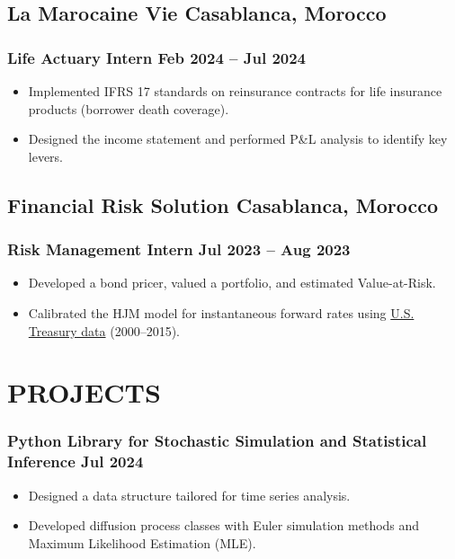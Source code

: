 \documentclass[11pt]{amdresume}
\begin{document}
\subsection{La Marocaine Vie \hfill Casablanca, Morocco}
\subsubsection{Life Actuary Intern \dotfill Feb 2024 – Jul 2024}
\begin{itemize}
\item Implemented IFRS 17 standards on reinsurance contracts for life insurance products (borrower death coverage).
\item Designed the income statement and performed P\&L analysis to identify key levers.
\end{itemize}

\subsection{Financial Risk Solution \hfill Casablanca, Morocco}
\subsubsection{Risk Management Intern \dotfill Jul 2023 – Aug 2023}
\begin{itemize}
\item Developed a bond pricer, valued a portfolio, and estimated Value-at-Risk.
\item Calibrated the HJM model for instantaneous forward rates using \href{https://www.federalreserve.gov/econres/feds/the-us-treasury-yield-curve-1961-to-the-present.htm}{U.S. Treasury data} (2000–2015).
\end{itemize}

\section{PROJECTS}

\subsubsection{Python Library for Stochastic Simulation and Statistical Inference \dotfill Jul 2024}
\begin{itemize}
    \item Designed a data structure tailored for time series analysis.
    \item Developed diffusion process classes with Euler simulation methods and Maximum Likelihood Estimation (MLE).
\end{itemize}
\end{document}
